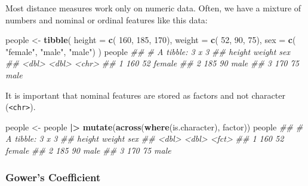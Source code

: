 \documentclass[
  notitlepage]{book}
\newenvironment{Shaded}{\begin{snugshade}}{\end{snugshade}}
\newcommand{\CommentTok}[1]{\textcolor[rgb]{0.56,0.35,0.01}{\textit{#1}}}
\newcommand{\DataTypeTok}[1]{\textcolor[rgb]{0.13,0.29,0.53}{#1}}
\newcommand{\DecValTok}[1]{\textcolor[rgb]{0.00,0.00,0.81}{#1}}
\newcommand{\ErrorTok}[1]{\textcolor[rgb]{0.64,0.00,0.00}{\textbf{#1}}}
\newcommand{\KeywordTok}[1]{\textcolor[rgb]{0.13,0.29,0.53}{\textbf{#1}}}
\newcommand{\NormalTok}[1]{#1}
\newcommand{\OperatorTok}[1]{\textcolor[rgb]{0.81,0.36,0.00}{\textbf{#1}}}
\newcommand{\StringTok}[1]{\textcolor[rgb]{0.31,0.60,0.02}{#1}}
\begin{document}
Most distance measures work only on numeric data. Often, we have a
mixture of numbers and nominal or ordinal features like this data:

\begin{Shaded}
\begin{Highlighting}[]
\NormalTok{people \textless{}{-}}\StringTok{ }\KeywordTok{tibble}\NormalTok{(}
  \DataTypeTok{height =} \KeywordTok{c}\NormalTok{(      }\DecValTok{160}\NormalTok{,    }\DecValTok{185}\NormalTok{,    }\DecValTok{170}\NormalTok{),}
  \DataTypeTok{weight =} \KeywordTok{c}\NormalTok{(       }\DecValTok{52}\NormalTok{,     }\DecValTok{90}\NormalTok{,     }\DecValTok{75}\NormalTok{),}
  \DataTypeTok{sex    =} \KeywordTok{c}\NormalTok{( }\StringTok{"female"}\NormalTok{, }\StringTok{"male"}\NormalTok{, }\StringTok{"male"}\NormalTok{)}
\NormalTok{)}
\NormalTok{people}
\CommentTok{\#\# \# A tibble: 3 x 3}
\CommentTok{\#\#   height weight sex   }
\CommentTok{\#\#    \textless{}dbl\textgreater{}  \textless{}dbl\textgreater{} \textless{}chr\textgreater{} }
\CommentTok{\#\# 1    160     52 female}
\CommentTok{\#\# 2    185     90 male  }
\CommentTok{\#\# 3    170     75 male}
\end{Highlighting}
\end{Shaded}

It is important that nominal features are stored as factors and not
character (\texttt{\textless{}chr\textgreater{}}).

\begin{Shaded}
\begin{Highlighting}[]
\NormalTok{people \textless{}{-}}\StringTok{ }\NormalTok{people }\OperatorTok{|}\ErrorTok{\textgreater{}}\StringTok{ }
\StringTok{  }\KeywordTok{mutate}\NormalTok{(}\KeywordTok{across}\NormalTok{(}\KeywordTok{where}\NormalTok{(is.character), factor))}
\NormalTok{people}
\CommentTok{\#\# \# A tibble: 3 x 3}
\CommentTok{\#\#   height weight sex   }
\CommentTok{\#\#    \textless{}dbl\textgreater{}  \textless{}dbl\textgreater{} \textless{}fct\textgreater{} }
\CommentTok{\#\# 1    160     52 female}
\CommentTok{\#\# 2    185     90 male  }
\CommentTok{\#\# 3    170     75 male}
\end{Highlighting}
\end{Shaded}

\hypertarget{gowers-coefficient}{%
\subsubsection{Gower's Coefficient}\label{gowers-coefficient}}
\end{document}
